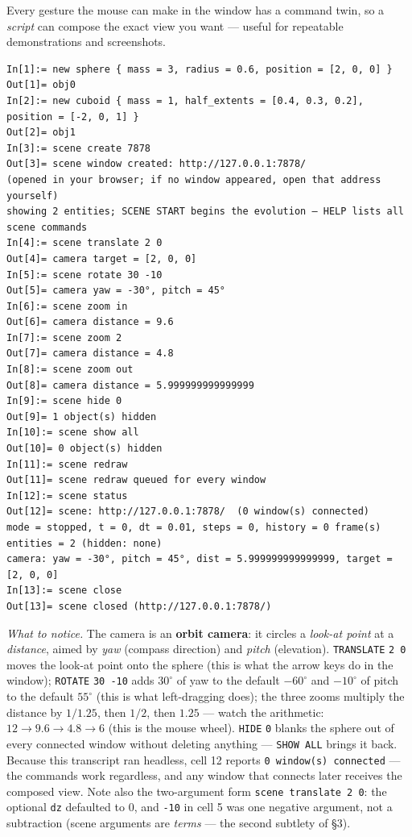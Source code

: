 \documentclass[11pt]{article}
\newcommand{\kw}[1]{\texttt{\uppercase{#1}}}
\newcommand{\code}[1]{\texttt{#1}}
\begin{document}
Every gesture the mouse can make in the window has a command twin, so
a \emph{script} can compose the exact view you want --- useful for
repeatable demonstrations and screenshots.

\begin{lstlisting}
In[1]:= new sphere { mass = 3, radius = 0.6, position = [2, 0, 0] }
Out[1]= obj0
In[2]:= new cuboid { mass = 1, half_extents = [0.4, 0.3, 0.2], position = [-2, 0, 1] }
Out[2]= obj1
In[3]:= scene create 7878
Out[3]= scene window created: http://127.0.0.1:7878/
(opened in your browser; if no window appeared, open that address yourself)
showing 2 entities; SCENE START begins the evolution — HELP lists all scene commands
In[4]:= scene translate 2 0
Out[4]= camera target = [2, 0, 0]
In[5]:= scene rotate 30 -10
Out[5]= camera yaw = -30°, pitch = 45°
In[6]:= scene zoom in
Out[6]= camera distance = 9.6
In[7]:= scene zoom 2
Out[7]= camera distance = 4.8
In[8]:= scene zoom out
Out[8]= camera distance = 5.999999999999999
In[9]:= scene hide 0
Out[9]= 1 object(s) hidden
In[10]:= scene show all
Out[10]= 0 object(s) hidden
In[11]:= scene redraw
Out[11]= scene redraw queued for every window
In[12]:= scene status
Out[12]= scene: http://127.0.0.1:7878/  (0 window(s) connected)
mode = stopped, t = 0, dt = 0.01, steps = 0, history = 0 frame(s)
entities = 2 (hidden: none)
camera: yaw = -30°, pitch = 45°, dist = 5.999999999999999, target = [2, 0, 0]
In[13]:= scene close
Out[13]= scene closed (http://127.0.0.1:7878/)
\end{lstlisting}

\emph{What to notice.} The camera is an \textbf{orbit camera}: it
circles a \emph{look-at point} at a \emph{distance}, aimed by
\emph{yaw} (compass direction) and \emph{pitch} (elevation).
\kw{translate} \code{2 0} moves the look-at point onto the sphere
(this is what the arrow keys do in the window); \kw{rotate}
\code{30 -10} adds $30^\circ$ of yaw to the default $-60^\circ$ and
$-10^\circ$ of pitch to the default $55^\circ$ (this is what
left-dragging does); the three zooms multiply the distance by
$1/1.25$, then $1/2$, then $1.25$ --- watch the arithmetic:
$12 \to 9.6 \to 4.8 \to 6$ (this is the mouse wheel). \kw{hide}
\code{0} blanks the sphere out of every connected window without
deleting anything --- \kw{show all} brings it back. Because this
transcript ran headless, cell 12 reports \code{0 window(s) connected}
--- the commands work regardless, and any window that connects later
receives the composed view. Note also the two-argument form
\code{scene translate 2 0}: the optional \code{dz} defaulted to 0, and
\code{-10} in cell 5 was one negative argument, not a subtraction
(scene arguments are \emph{terms} --- the second subtlety of \S3).
\end{document}
